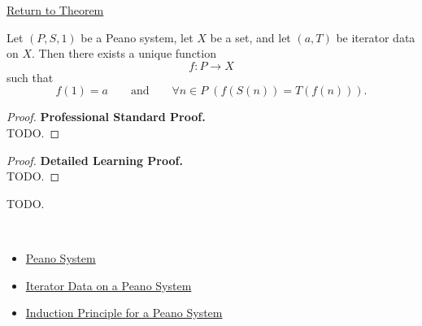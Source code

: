 \newpage
{}
\label{prf:peano-iterator-theorem}

\begin{remark*}[Return]
\hyperref[thm:peano-iterator-theorem]{Return to Theorem}
\end{remark*}

\begin{theorem*}
Let $(P,S,1)$ be a Peano system, let $X$ be a set, and let $(a,T)$ be iterator
data on $X$. Then there exists a unique function
\[
f : P \to X
\]
such that
\[
f(1)=a
\qquad\text{and}\qquad
\forall n \in P\;(f(S(n))=T(f(n))).
\]
\end{theorem*}

\begin{proof}
\textbf{Professional Standard Proof.}~\\
TODO.
\end{proof}

\begin{proof}
\textbf{Detailed Learning Proof.}~\\
TODO.
\end{proof}

\begin{remark*}
TODO.
\end{remark*}

\begin{remark*}[Dependencies]~\\
\begin{itemize}
  \item \hyperref[def:peano-system]{Peano System}
  \item \hyperref[def:iterator-data-on-peano-system]{Iterator Data on a Peano System}
  \item \hyperref[thm:induction-principle-for-peano-system]{Induction Principle for a Peano System}
\end{itemize}
\end{remark*}
